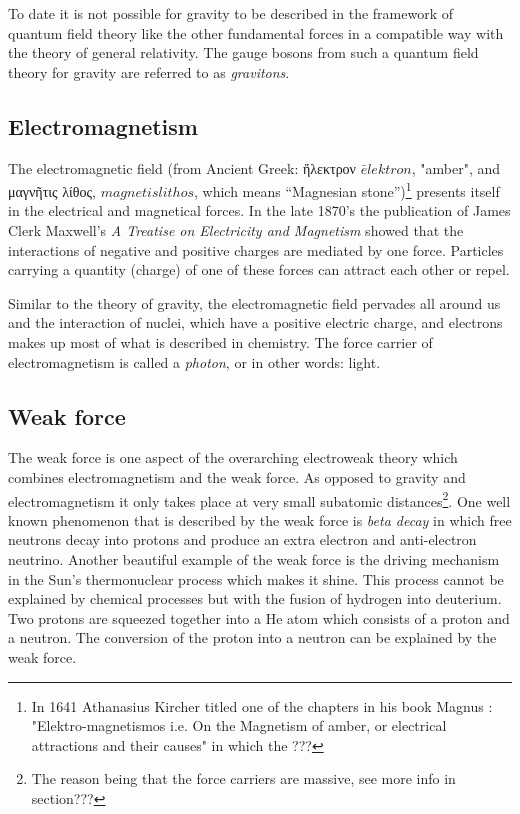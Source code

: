 To date it is not possible for gravity to be described in the framework of quantum field theory like the other fundamental forces in a compatible way with the theory of general relativity. The gauge bosons from such a quantum field theory for gravity are referred to as \textit{gravitons}.

\subsection*{Electromagnetism}
The electromagnetic field (from Ancient Greek: \gr ἤλεκτρον \en $\bar{e}lektron$, "amber", and \gr μαγνῆτις λίθος, \en $magnetis lithos$, which means ``Magnesian stone'')\footnote{In 1641 Athanasius Kircher titled one of the chapters in his book Magnus \cite{BLABLABLA}: "Elektro-magnetismos i.e. On the Magnetism of amber, or electrical attractions and their causes" in which the ???} presents itself in the electrical and magnetical forces. In the late 1870's the publication of James Clerk Maxwell's \textit{A Treatise on Electricity and Magnetism} showed that the interactions of negative and positive charges are mediated by one force. Particles carrying a quantity (charge) of one of these forces can attract each other or repel.

Similar to the theory of gravity, the electromagnetic field pervades all around us and the interaction of nuclei, which have a positive electric charge, and electrons makes up most of what is described in chemistry. The force carrier of electromagnetism is called a \textit{photon}, or in other words: light.
\subsection*{Weak force}
The weak force is one aspect of the overarching electroweak theory which combines electromagnetism and the weak force. As opposed to gravity and electromagnetism it only takes place at very small subatomic distances\footnote{The reason being that the force carriers are massive, see more info in section???}. One well known phenomenon that is described by the weak force is \textit{beta decay} in which free neutrons decay into protons and produce an extra electron and anti-electron neutrino. Another beautiful example of the weak force is the driving mechanism in the Sun's thermonuclear process which makes it shine. This process cannot be explained by chemical processes but with the fusion of hydrogen into deuterium. Two protons are squeezed together into a He atom which consists of a proton and a neutron. The conversion of the proton into a neutron can be explained by the weak force.

